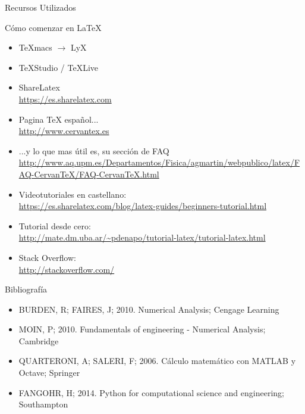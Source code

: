 \documentclass [8pt] {beamer}
\begin{document}
        \begin{frame}{Recursos Utilizados}
            \begin{block}{Cómo comenzar en \LaTeX{}}
                \begin{itemize}
                    \item<1-> TeXmacs $\rightarrow$ LyX \\
                    \item<2-> TeXStudio / TeXLive
                    \item<3-> ShareLatex \\ \url{https://es.sharelatex.com}
                    \item<4-> Pagina TeX español... \\ \url {http://www.cervantex.es}
                    \item<5-> ...y lo que mas útil es, su sección de FAQ \\ \url {http://www.aq.upm.es/Departamentos/Fisica/agmartin/webpublico/latex/FAQ-CervanTeX/FAQ-CervanTeX.html}
                    \item<6-> Videotutoriales en castellano: \\ \url {https://es.sharelatex.com/blog/latex-guides/beginners-tutorial.html}
                    \item<7-> Tutorial desde cero: \\ \url{http://mate.dm.uba.ar/~pdenapo/tutorial-latex/tutorial-latex.html}
                    \item<8-> Stack Overflow: \\ \url {http://stackoverflow.com/}
                \end{itemize}
            \end{block}
        \end{frame}

\begin{frame}{Bibliografía}
    \begin{itemize}
        \item BURDEN, R; FAIRES, J; 2010. Numerical Analysis; Cengage Learning
        \item MOIN, P; 2010. Fundamentals of engineering - Numerical Analysis; Cambridge
        \item QUARTERONI, A; SALERI, F; 2006. Cálculo matemático con MATLAB y Octave; Springer
        \item FANGOHR, H; 2014. Python for computational science and engineering; Southampton
    \end{itemize}
\end{frame}
\end{document}
